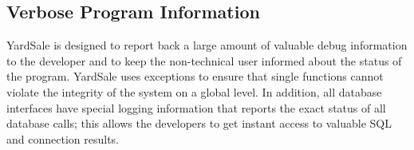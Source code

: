 \documentclass{report}
\begin{document}
\subsection{Verbose Program Information}
YardSale is designed to report back a large amount of valuable debug information to the developer and to keep the non-technical user
informed about the status of the program.  YardSale uses exceptions to ensure that single functions cannot violate the integrity of the system
on a global level.  In addition, all database interfaces have special logging information that reports the exact status of all database calls; this
allows the developers to get instant access to valuable SQL and connection results.
\end{document}
